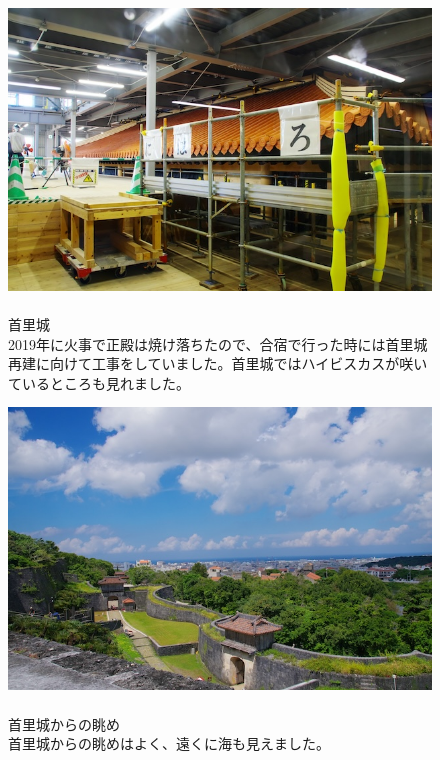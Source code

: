\documentclass[../main]{subfiles}
\begin{document}
\begin{figure}[H]
  \begin{minipage}[b]{0.48\columnwidth}
    \caption{\\
    首里城\\
    2019年に火事で正殿は焼け落ちたので、合宿で行った時には首里城再建に向けて工事をしていました。首里城ではハイビスカスが咲いているところも見れました。
    }
  \end{minipage}
  \hspace{0.04\columnwidth} %
  \begin{minipage}[b]{0.48\columnwidth}
    \centering
    \includegraphics[width=\columnwidth]{figure/kouzityuu_syurizyou.jpg}
  \end{minipage}
\end{figure}

\begin{figure}[H]
  \begin{minipage}[b]{0.48\columnwidth}
    \centering
    \includegraphics[width=\columnwidth]{figure/view_syurizyou.jpg}
  \end{minipage}
  \hspace{0.04\columnwidth} %
  \begin{minipage}[b]{0.48\columnwidth}
    \caption{\\
    首里城からの眺め\\
    首里城からの眺めはよく、遠くに海も見えました。
    }
  \end{minipage}
\end{figure}
\end{document}
